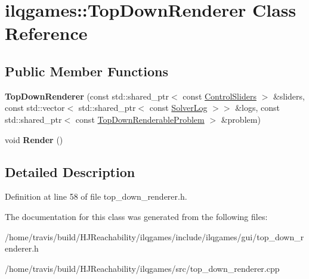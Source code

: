 \hypertarget{classilqgames_1_1_top_down_renderer}{}\section{ilqgames\+:\+:Top\+Down\+Renderer Class Reference}
\label{classilqgames_1_1_top_down_renderer}
\subsection*{Public Member Functions}
\begin{DoxyCompactItemize}
\item 
{\bfseries Top\+Down\+Renderer} (const std\+::shared\+\_\+ptr$<$ const \hyperlink{classilqgames_1_1_control_sliders}{Control\+Sliders} $>$ \&sliders, const std\+::vector$<$ std\+::shared\+\_\+ptr$<$ const \hyperlink{classilqgames_1_1_solver_log}{Solver\+Log} $>$$>$ \&logs, const std\+::shared\+\_\+ptr$<$ const \hyperlink{classilqgames_1_1_top_down_renderable_problem}{Top\+Down\+Renderable\+Problem} $>$ \&problem)\hypertarget{classilqgames_1_1_top_down_renderer_a189aee6171b80a800f84b130e14e3f0c}{}\label{classilqgames_1_1_top_down_renderer_a189aee6171b80a800f84b130e14e3f0c}

\item 
void {\bfseries Render} ()\hypertarget{classilqgames_1_1_top_down_renderer_af50dc993130fbca96d4269e307bf2dae}{}\label{classilqgames_1_1_top_down_renderer_af50dc993130fbca96d4269e307bf2dae}

\end{DoxyCompactItemize}


\subsection{Detailed Description}


Definition at line 58 of file top\+\_\+down\+\_\+renderer.\+h.



The documentation for this class was generated from the following files\+:\begin{DoxyCompactItemize}
\item 
/home/travis/build/\+H\+J\+Reachability/ilqgames/include/ilqgames/gui/top\+\_\+down\+\_\+renderer.\+h\item 
/home/travis/build/\+H\+J\+Reachability/ilqgames/src/top\+\_\+down\+\_\+renderer.\+cpp\end{DoxyCompactItemize}
